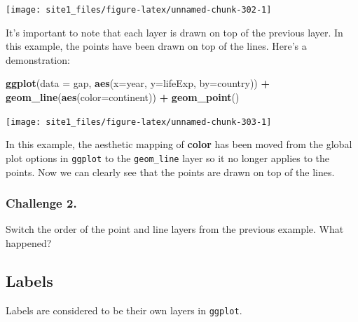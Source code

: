 \documentclass[]{book}
\newenvironment{Shaded}{\begin{snugshade}}{\end{snugshade}}
\newcommand{\DataTypeTok}[1]{\textcolor[rgb]{0.13,0.29,0.53}{#1}}
\newcommand{\KeywordTok}[1]{\textcolor[rgb]{0.13,0.29,0.53}{\textbf{#1}}}
\newcommand{\NormalTok}[1]{#1}
\newcommand{\OperatorTok}[1]{\textcolor[rgb]{0.81,0.36,0.00}{\textbf{#1}}}
\newcommand{\StringTok}[1]{\textcolor[rgb]{0.31,0.60,0.02}{#1}}
\begin{document}
\begin{center}\texttt{[image: site1\_files/figure-latex/unnamed-chunk-302-1]} \end{center}

It's important to note that each layer is drawn on top of the previous layer. In this example, the points have been drawn on top of the lines. Here's a demonstration:

\begin{Shaded}
\begin{Highlighting}[]
\KeywordTok{ggplot}\NormalTok{(}\DataTypeTok{data =}\NormalTok{ gap, }\KeywordTok{aes}\NormalTok{(}\DataTypeTok{x=}\NormalTok{year, }\DataTypeTok{y=}\NormalTok{lifeExp, }\DataTypeTok{by=}\NormalTok{country)) }\OperatorTok{+}\StringTok{ }
\StringTok{  }\KeywordTok{geom_line}\NormalTok{(}\KeywordTok{aes}\NormalTok{(}\DataTypeTok{color=}\NormalTok{continent)) }\OperatorTok{+}\StringTok{ }
\StringTok{  }\KeywordTok{geom_point}\NormalTok{()}
\end{Highlighting}
\end{Shaded}

\begin{center}\texttt{[image: site1\_files/figure-latex/unnamed-chunk-303-1]} \end{center}

In this example, the aesthetic mapping of \textbf{color} has been moved from the global plot options in \texttt{ggplot} to the \texttt{geom\_line} layer so it no longer applies to the points. Now we can clearly see that the points are drawn on top of the lines.

\hypertarget{challenge-2.-8}{%
\subsubsection*{Challenge 2.}\label{challenge-2.-8}}

Switch the order of the point and line layers from the previous example. What happened?

\hypertarget{labels-1}{%
\subsection{Labels}\label{labels-1}}

Labels are considered to be their own layers in \texttt{ggplot}.
\end{document}
